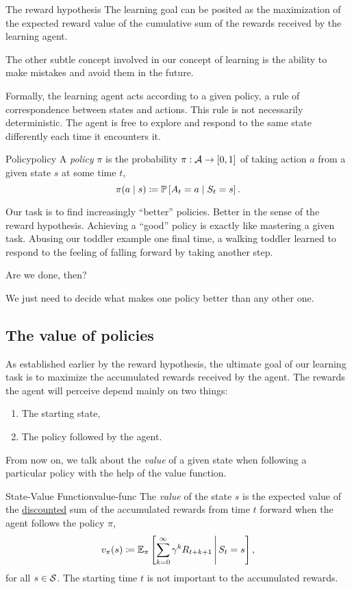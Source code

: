\begin{remark}{The reward hypothesis}
	The learning goal can be posited as the maximization of the expected reward
	value of the cumulative sum of the rewards received by the learning agent. 
\end{remark}

The other subtle concept involved in our concept of learning is the
ability to make mistakes and avoid them in the future.

Formally, the learning agent acts according to a given policy, a rule of
correspondence between states and actions. This rule is not necessarily
deterministic. The agent is free to explore and respond to the same state
differently each time it encounters it.

\begin{dfn}{Policy}{policy}
	A \emph{policy} $\pi$ is the probability $\pi: \mathcal{A} \to [0,1]$ of taking
	action $a$ from a given state $s$ at some time $t$,
	\[
		\pi(a \mid s) \coloneqq \mathbb{P}\left[A_t = a \mid S_t = s\right].
	\]
\end{dfn}

Our task is to find increasingly ``better'' policies. Better in the sense of the
reward hypothesis. Achieving a ``good'' policy is exactly like mastering a given
task. Abusing our toddler example one final time, a walking toddler learned to
respond to the feeling of falling forward by taking another step.

Are we done, then? 

We just need to decide what makes one policy better than any other one.

\subsection{The value of policies}

As established earlier by the reward hypothesis, the ultimate goal of our
learning task is to maximize the accumulated rewards received by the agent. The
rewards the agent will perceive depend mainly on two things:
\begin{enumerate}
	\item The starting state,
	\item The policy followed by the agent.
\end{enumerate}

From now on, we talk about the \textit{value} of a given state when following a
particular policy with the help of the value function.

\begin{dfn}{State-Value Function}{value-func}
	The \emph{value} of the state $s$ is the expected value of the
	\underline{discounted} sum of the accumulated rewards from time $t$ forward
	when the agent follows the policy $\pi$,
	\[
		v_{\pi} (s) \coloneqq \mathbb{E}_{\pi} \left[\sum_{k=0}^{\infty} \gamma^{k} R_{t+k+1} \,\middle\vert\, S_{t} = s\right],
	\]
	for all $s \in \mathcal{S}$. The starting time $t$ is not important to the
	accumulated rewards.
\end{dfn}


